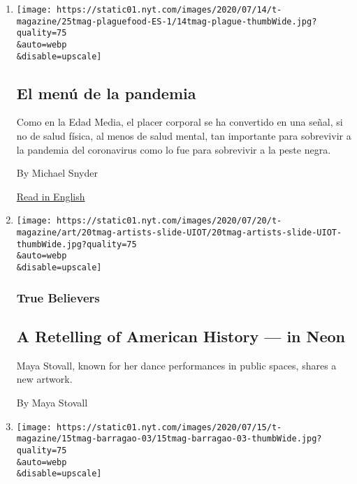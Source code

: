 \begin{enumerate}
\def\labelenumi{\arabic{enumi}.}
\item
  \href{/es/2020/07/23/t-magazine/comida-pandemia.html}{}

  \texttt{[image: https://static01.nyt.com/images/2020/07/14/t-magazine/25tmag-plaguefood-ES-1/14tmag-plague-thumbWide.jpg?quality=75\\\&auto=webp\\\&disable=upscale]}

  \hypertarget{el-menuxfa-de-la-pandemia}{%
  \subsection{El menú de la pandemia}\label{el-menuxfa-de-la-pandemia}}

  Como en la Edad Media, el placer corporal se ha convertido en una
  señal, si no de salud física, al menos de salud mental, tan importante
  para sobrevivir a la pandemia del coronavirus como lo fue para
  sobrevivir a la peste negra.

  By Michael Snyder

  \href{https://www.nytimes.com/2020/07/16/t-magazine/eating-food-during-plague.html}{Read
  in English}
\item
  \href{/2020/07/20/t-magazine/maya-stovall.html}{}

  \texttt{[image: https://static01.nyt.com/images/2020/07/20/t-magazine/art/20tmag-artists-slide-UIOT/20tmag-artists-slide-UIOT-thumbWide.jpg?quality=75\\\&auto=webp\\\&disable=upscale]}

  \hypertarget{true-believers-11}{%
  \subsubsection{True Believers}\label{true-believers-11}}

  \hypertarget{a-retelling-of-american-history--in-neon}{%
  \subsection{A Retelling of American History --- in
  Neon}\label{a-retelling-of-american-history--in-neon}}

  Maya Stovall, known for her dance performances in public spaces,
  shares a new artwork.

  By Maya Stovall
\item
  \href{/2020/07/17/t-magazine/summer-recipes-arjamolho-soup-vanessa-barragao.html}{}

  \texttt{[image: https://static01.nyt.com/images/2020/07/15/t-magazine/15tmag-barragao-03/15tmag-barragao-03-thumbWide.jpg?quality=75\\\&auto=webp\\\&disable=upscale]}


\end{enumerate}
